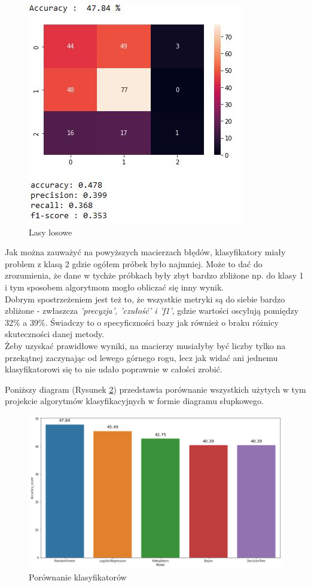 \documentclass{article}
\begin{document}
	\newpage
	
	\begin{figure}[ht!]
		\centering
		\includegraphics[width=.55\textwidth]{ss/9.JPG}
		\caption{Lasy losowe}
		\label{tab:fore}
	\end{figure}
 
 
    Jak można zauważyć na powyższych macierzach błędów, klasyfikatory miały problem z klasą 2 gdzie ogółem próbek było najmniej. Może to dać do zrozumienia, że dane w tychże próbkach były zbyt bardzo zbliżone np. do klasy 1 i tym sposobem algorytmom mogło obliczać się inny wynik.\\
    Dobrym spostrzeżeniem jest też to, że wszystkie metryki są do siebie bardzo zbliżone - zwłaszcza \textit{'precyzja', 'czułość' i 'f1'}, gdzie wartości oscylują pomiędzy 32\% a 39\%. Świadczy to o specyficzności bazy jak również o braku różnicy skuteczności danej metody.\\
    Żeby uzyskać prawidłowe wyniki, na macierzy musiałyby być liczby tylko na przekątnej zaczynając od lewego górnego rogu, lecz jak widać ani jednemu klasyfikatorowi się to nie udało poprawnie w całości zrobić.
    
    Poniższy diagram (Rysunek \ref{tab:porow}) przedstawia porównanie wszystkich użytych w tym projekcie algorytmów klasyfikacyjnych w formie diagramu słupkowego.
 
 
 
    \begin{figure}[ht!]
		\centering
		\includegraphics[width=.99\textwidth]{ss/10.PNG}
		\caption{Porównanie klasyfikatorów}
		\label{tab:porow}
	\end{figure}
	
\end{document}
